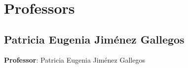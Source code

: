 \documentclass{article}
\begin{document}
            


            \tableofcontents
            \clearpage  %

            \setcounter{page}{1}

            
        \section{Professors} 

        \subsection{Patricia Eugenia Jim\'enez Gallegos}
        \vspace*{.1cm}
        
        \begin{flushright}
            {\LARGE \textbf{Professor}: Patricia Eugenia Jim\'enez Gallegos}
        \end{flushright}
        \vspace{1cm}
\end{document}
